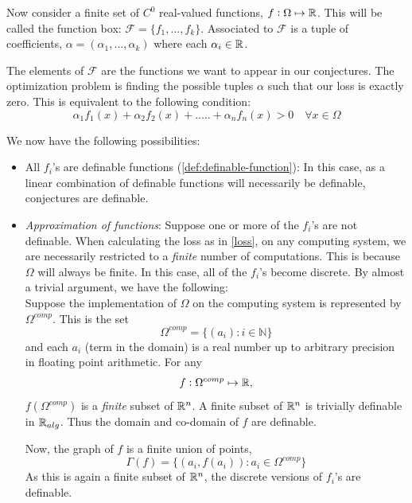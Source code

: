 Now consider a  finite set of $C^0$ real-valued functions, $f:\Omega\mapsto\mathbb{R}$. This will be called the function box: $\mathcal{F} = \{f_1,...,f_k\}$. Associated to $\mathcal{F}$ is a tuple of coefficients, $\alpha = (\alpha_1,...,\alpha_k)$ where each $\alpha_i\in\mathbb{R}$.

The elements of $\mathcal{F}$ are the functions we want to appear in our conjectures. The optimization problem is finding the possible tuples $\alpha$ such that our loss is exactly zero. This is equivalent to the following condition:
\begin{equation}
    \label{loss}
    \alpha_1f_1(x)+\alpha_2f_2(x)+.....+\alpha_nf_n(x) > 0 \quad\forall x\in\Omega
\end{equation}

We now have the following possibilities:
\begin{itemize}
    \item All $f_i$'s are definable functions (\ref{def:definable-function}): In this case, as a linear combination of definable functions will necessarily be definable, conjectures are definable.
    \item \textit{Approximation of functions}: Suppose one or more of the $f_i$'s are not definable. When calculating the loss as in \ref{loss}, on any computing system, we are necessarily restricted to a \textit{finite} number of computations.
          This is because $\Omega$ will always be finite. In this case, all of the $f_i$'s become discrete. By almost a trivial argument, we have the following:\\
        Suppose the implementation of $\Omega$ on the computing system is represented by $\Omega^{comp}$. This is the set
        \begin{equation*}
            \Omega^{comp} = \{(a_i) : i\in \mathbb{N}\} 
        \end{equation*}
        and each $a_i$ (term in the domain) is a real number up to arbitrary precision in floating point arithmetic.
        For any
        \begin{equation*}
            f:\Omega^{comp}\mapsto\mathbb{R},
        \end{equation*}
        $f(\Omega^{comp})$ is a \textit{finite} subset of $\mathbb{R}^n$. A finite subset of $\mathbb{R}^n$ is trivially definable in $\mathbb{R}_{alg}$. Thus the domain and co-domain of $f$ are definable.
        \par Now, the graph of $f$ is a finite union of points,
        \begin{equation}
            \label{eq:graph}
            \Gamma(f) = \{(a_i, f(a_i)): a_i\in\Omega^{comp}\}
        \end{equation}
        As this is again a finite subset of $\mathbb{R}^n$, the discrete versions of $f_i$'s are definable.
\end{itemize}

